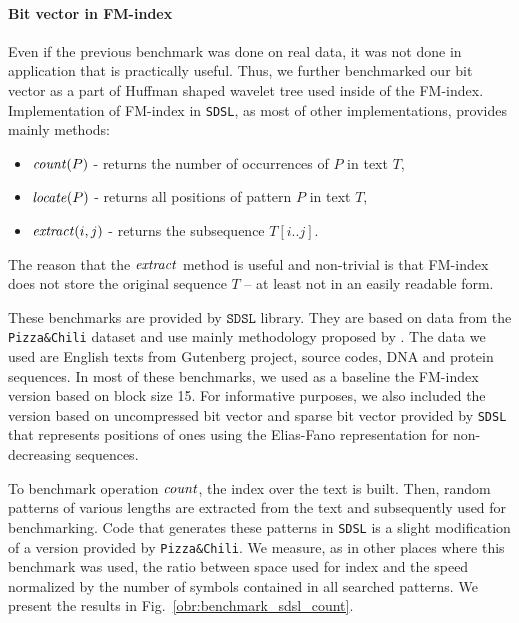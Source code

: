 \paragraph{Bit vector in FM-index}

Even if the previous benchmark was done on real data, it was not done in application that is
practically useful. Thus, we further benchmarked our bit vector as a part of Huffman shaped
wavelet tree used inside of the FM-index. Implementation of FM-index in \texttt{SDSL}, as most
of other implementations, provides mainly methods:
\begin{itemize}
	\item $\mathit{count}(P)$ - returns the number of occurrences of $P$ in text $T$,
	\item $\mathit{locate}(P)$ - returns all positions of pattern $P$ in text $T$,
	\item $\mathit{extract}(i, j)$ - returns the subsequence $T[i..j]$.
\end{itemize}
The reason that the $\mathit{extract}$ method is useful and non-trivial is that FM-index
does not store the original sequence $T$ -- at least not in an easily readable form.

These benchmarks are provided by $\texttt{SDSL}$ library. They are based on data from
the \texttt{Pizza\&Chili} dataset and use mainly methodology proposed by \cite{ferragina2009compressed}.
The data we used are English texts from Gutenberg project, source codes, DNA and protein
sequences. In most of these benchmarks, we used as a baseline the FM-index version based
on block size 15. For informative purposes, we also included the version based on uncompressed
bit vector and sparse bit vector provided by \texttt{SDSL} that represents positions of ones
using the Elias-Fano representation for non-decreasing sequences.

To benchmark operation $\mathit{count}$, the index over the text is built. Then, random patterns of
various lengths are extracted from the text and subsequently used for benchmarking. Code
that generates these patterns in \texttt{SDSL} is a slight modification of a version provided
by \texttt{Pizza\&Chili}. We measure, as in other places where this benchmark was used, the
ratio between space used for index and the speed normalized by the number of symbols contained
in all searched patterns. We present the results in Fig.~\ref{obr:benchmark_sdsl_count}.

